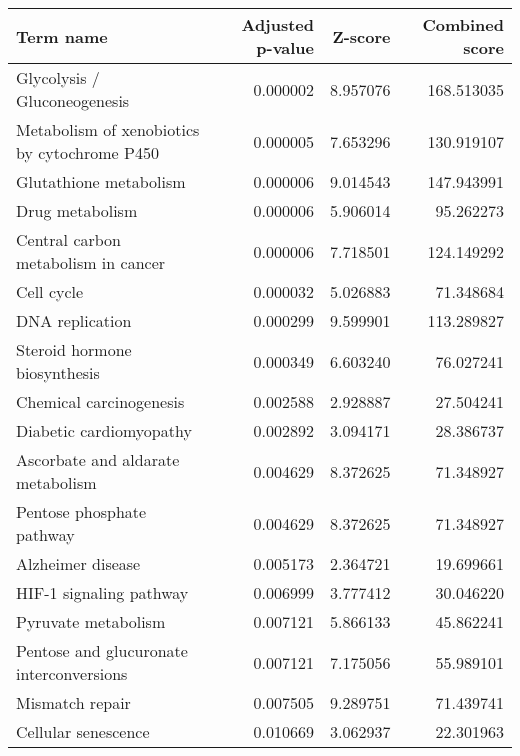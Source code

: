 \begin{tabular}{lrrr}
\toprule
                                   Term name &  Adjusted p-value &  Z-score &  Combined score \\
\midrule
                Glycolysis / Gluconeogenesis &          0.000002 & 8.957076 &      168.513035 \\
Metabolism of xenobiotics by cytochrome P450 &          0.000005 & 7.653296 &      130.919107 \\
                      Glutathione metabolism &          0.000006 & 9.014543 &      147.943991 \\
                             Drug metabolism &          0.000006 & 5.906014 &       95.262273 \\
         Central carbon metabolism in cancer &          0.000006 & 7.718501 &      124.149292 \\
                                  Cell cycle &          0.000032 & 5.026883 &       71.348684 \\
                             DNA replication &          0.000299 & 9.599901 &      113.289827 \\
                Steroid hormone biosynthesis &          0.000349 & 6.603240 &       76.027241 \\
                     Chemical carcinogenesis &          0.002588 & 2.928887 &       27.504241 \\
                     Diabetic cardiomyopathy &          0.002892 & 3.094171 &       28.386737 \\
           Ascorbate and aldarate metabolism &          0.004629 & 8.372625 &       71.348927 \\
                   Pentose phosphate pathway &          0.004629 & 8.372625 &       71.348927 \\
                           Alzheimer disease &          0.005173 & 2.364721 &       19.699661 \\
                     HIF-1 signaling pathway &          0.006999 & 3.777412 &       30.046220 \\
                         Pyruvate metabolism &          0.007121 & 5.866133 &       45.862241 \\
    Pentose and glucuronate interconversions &          0.007121 & 7.175056 &       55.989101 \\
                             Mismatch repair &          0.007505 & 9.289751 &       71.439741 \\
                         Cellular senescence &          0.010669 & 3.062937 &       22.301963 \\

\end{tabular}
